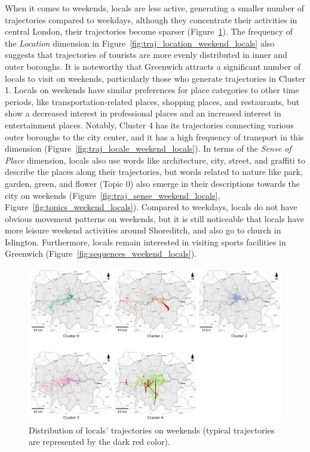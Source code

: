\documentclass{article}
\theoremstyle{definition}
\theoremstyle{remark}
\begin{document}
When it comes to weekends, locals are less active, generating a smaller number of trajectories compared to weekdays, although they concentrate their activities in central London, their trajectories become sparser (Figure~\ref{fig:traj_distribution_weekend_locals}). The frequency of the \textit{Location} dimension in Figure~\ref{fig:traj_location_weekend_locals} also suggests that trajectories of tourists are more evenly distributed in inner and outer boroughs. It is noteworthy that Greenwich attracts a significant number of locals to visit on weekends, particularly those who generate trajectories in Cluster 1. Locals on weekends have similar preferences for place categories to other time periods, like transportation-related places, shopping places, and restaurants, but show a decreased interest in professional places and an increased interest in entertainment places. Notably, Cluster 4 has its trajectories connecting various outer boroughs to the city center, and it has a high frequency of transport in this dimension (Figure~\ref{fig:traj_locale_weekend_locals}). In terms of the \textit{Sense of Place} dimension, locals also use words like architecture, city, street, and graffiti to describe the places along their trajectories, but words related to nature like park, garden, green, and flower (Topic 0) also emerge in their descriptions towards the city on weekends (Figure~\ref{fig:traj_sense_weekend_locals}, Figure~\ref{fig:topics_weekend_locals}). Compared to weekdays, locals do not have obvious movement patterns on weekends, but it is still noticeable that locals have more leisure weekend activities around Shoreditch, and also go to church in Islington. Furthermore, locals remain interested in visiting sports facilities in Greenwich (Figure~\ref{fig:sequences_weekend_locals}).

\begin{figure}[!h]
\centering
\includegraphics[width=1\textwidth]{figures/traj_distribution_weekend_locals.png}
\caption{\label{fig:traj_distribution_weekend_locals}Distribution of locals' trajectories on weekends (typical trajectories are represented by the dark red color).}
\end{figure}
\end{document}
